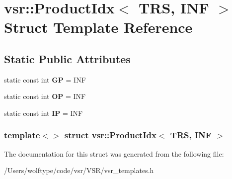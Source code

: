 \hypertarget{structvsr_1_1_product_idx_3_01_t_r_s_00_01_i_n_f_01_4}{\section{vsr\-:\-:Product\-Idx$<$ T\-R\-S, I\-N\-F $>$ Struct Template Reference}
\label{structvsr_1_1_product_idx_3_01_t_r_s_00_01_i_n_f_01_4}
}
\subsection*{Static Public Attributes}
\begin{DoxyCompactItemize}
\item 
\hypertarget{structvsr_1_1_product_idx_3_01_t_r_s_00_01_i_n_f_01_4_a0ff7da96d7e9c326d5536c2264c46b50}{static const int {\bfseries G\-P} = I\-N\-F}\label{structvsr_1_1_product_idx_3_01_t_r_s_00_01_i_n_f_01_4_a0ff7da96d7e9c326d5536c2264c46b50}

\item 
\hypertarget{structvsr_1_1_product_idx_3_01_t_r_s_00_01_i_n_f_01_4_aca7a2cf80c4648a7d73770807eba801a}{static const int {\bfseries O\-P} = I\-N\-F}\label{structvsr_1_1_product_idx_3_01_t_r_s_00_01_i_n_f_01_4_aca7a2cf80c4648a7d73770807eba801a}

\item 
\hypertarget{structvsr_1_1_product_idx_3_01_t_r_s_00_01_i_n_f_01_4_a647fb85402e2554bd29895854dd21e67}{static const int {\bfseries I\-P} = I\-N\-F}\label{structvsr_1_1_product_idx_3_01_t_r_s_00_01_i_n_f_01_4_a647fb85402e2554bd29895854dd21e67}

\end{DoxyCompactItemize}
\subsubsection*{template$<$$>$ struct vsr\-::\-Product\-Idx$<$ T\-R\-S, I\-N\-F $>$}



The documentation for this struct was generated from the following file\-:\begin{DoxyCompactItemize}
\item 
/\-Users/wolftype/code/vsr/\-V\-S\-R/vsr\-\_\-templates.\-h\end{DoxyCompactItemize}
